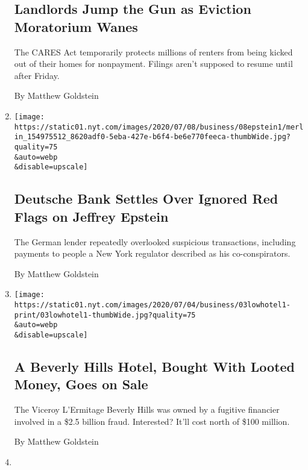 \begin{enumerate}
{  \subsection{Landlords Jump the Gun as Eviction Moratorium
  Wanes}\label{landlords-jump-the-gun-as-eviction-moratorium-wanes}}

  The CARES Act temporarily protects millions of renters from being
  kicked out of their homes for nonpayment. Filings aren't supposed to
  resume until after Friday.

  By Matthew Goldstein
\item
  \href{/2020/07/07/business/jeffrey-epstein-deutsche-bank-settlement.html}{}

  \texttt{[image: https://static01.nyt.com/images/2020/07/08/business/08epstein1/merlin\_154975512\_8620adf0-5eba-427e-b6f4-be6e770feeca-thumbWide.jpg?quality=75\\\&auto=webp\\\&disable=upscale]}

  \hypertarget{deutsche-bank-settles-over-ignored-red-flags-on-jeffrey-epstein}{%
  \subsection{Deutsche Bank Settles Over Ignored Red Flags on Jeffrey
  Epstein}\label{deutsche-bank-settles-over-ignored-red-flags-on-jeffrey-epstein}}

  The German lender repeatedly overlooked suspicious transactions,
  including payments to people a New York regulator described as his
  co-conspirators.

  By Matthew Goldstein
\item
  \href{/2020/07/03/business/viceroy-beverly-hills-1MDB-fraud.html}{}

  \texttt{[image: https://static01.nyt.com/images/2020/07/04/business/03lowhotel1-print/03lowhotel1-thumbWide.jpg?quality=75\\\&auto=webp\\\&disable=upscale]}

  \hypertarget{a-beverly-hills-hotel-bought-with-looted-money-goes-on-sale}{%
  \subsection{A Beverly Hills Hotel, Bought With Looted Money, Goes on
  Sale}\label{a-beverly-hills-hotel-bought-with-looted-money-goes-on-sale}}

  The Viceroy L'Ermitage Beverly Hills was owned by a fugitive financier
  involved in a \$2.5 billion fraud. Interested? It'll cost north of
  \$100 million.

  By Matthew Goldstein
\item
  \href{/2020/06/25/business/jay-clayton-sec-sdny.html}{}


\end{enumerate}

